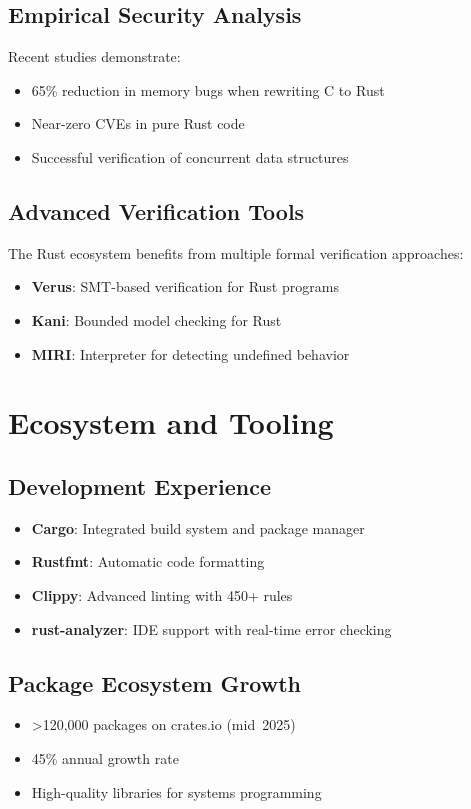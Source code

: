 \documentclass[11pt]{article}
\begin{document}
\subsection{Empirical Security Analysis}

Recent studies demonstrate:
\begin{itemize}
    \item 65\% reduction in memory bugs when rewriting C to Rust~\cite{acsac2022rust}
    \item Near-zero CVEs in pure Rust code~\cite{cveanalysis2023}
    \item Successful verification of concurrent data structures~\cite{verus2023}
\end{itemize}

\subsection{Advanced Verification Tools}

The Rust ecosystem benefits from multiple formal verification approaches:
\begin{itemize}
    \item \textbf{Verus}: SMT-based verification for Rust programs~\cite{verus2023}
    \item \textbf{Kani}: Bounded model checking for Rust
    \item \textbf{MIRI}: Interpreter for detecting undefined behavior
\end{itemize}

\section{Ecosystem and Tooling}

\subsection{Development Experience}
\begin{itemize}
    \item \textbf{Cargo}: Integrated build system and package manager
    \item \textbf{Rustfmt}: Automatic code formatting
    \item \textbf{Clippy}: Advanced linting with 450+ rules
    \item \textbf{rust-analyzer}: IDE support with real-time error checking
\end{itemize}

\subsection{Package Ecosystem Growth}
\begin{itemize}
    \item >120,000 packages on crates.io (mid 2025)
    \item 45\% annual growth rate
    \item High-quality libraries for systems programming
\end{itemize}
\end{document}
